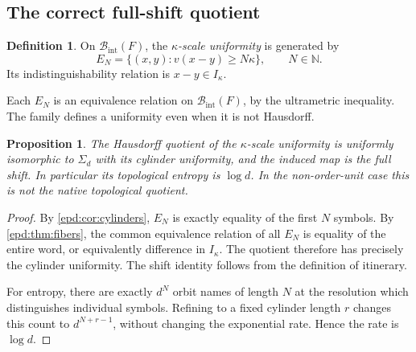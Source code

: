 \documentclass[11pt,a4paper]{article}
\numberwithin{equation}{section}
\theoremstyle{plain}
\newtheorem{proposition}[proposition]{Proposition}
\theoremstyle{definition}
\newtheorem{definition}[definition]{Definition}
\theoremstyle{remark}
\newcommand{\N}{\mathbb N}
\newcommand{\Ik}{I_\kappa}
\newcommand{\BI}{\mathcal B_{\mathrm{int}}}
\newcommand{\Sig}{\Sigma_d}
\begin{document}
\subsection{The correct full-shift quotient}
\begin{definition}\label{epd:def:scaletop}
On $\BI(F)$, the \emph{$\kappa$-scale uniformity} is generated by
\[
 E_N=\{(x,y):v(x-y)\geq N\kappa\},\qquad N\in\N.
\]
Its indistinguishability relation is $x-y\in\Ik$.
\end{definition}
Each $E_N$ is an equivalence relation on $\BI(F)$, by the ultrametric
inequality. The family defines a uniformity even when it is not
Hausdorff.

\begin{proposition}\label{epd:prop:scalequotient}
The Hausdorff quotient of the $\kappa$-scale uniformity is uniformly
isomorphic to $\Sig$ with its cylinder uniformity, and the induced map
is the full shift. In particular its topological entropy is $\log d$.
In the non-order-unit case this is not the native topological quotient.
\end{proposition}
\begin{proof}
By \cref{epd:cor:cylinders}, $E_N$ is exactly equality of the first $N$
symbols. By \cref{epd:thm:fibers}, the common equivalence relation of all
$E_N$ is equality of the entire word, or equivalently difference in
$\Ik$. The quotient therefore has precisely the cylinder uniformity.
The shift identity follows from the definition of itinerary.

For entropy, there are exactly $d^N$ orbit names of length $N$ at the
resolution which distinguishes individual symbols. Refining to a
fixed cylinder length $r$ changes this count to $d^{N+r-1}$, without
changing the exponential rate. Hence the rate is $\log d$.
\end{proof}
\end{document}
